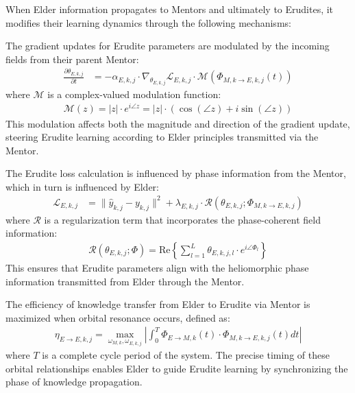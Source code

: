 When Elder information propagates to Mentors and ultimately to Erudites, it modifies their learning dynamics through the following mechanisms:

\begin{theorem}
The gradient updates for Erudite parameters are modulated by the incoming fields from their parent Mentor:
\begin{align}
\frac{\partial \theta_{E,k,j}}{\partial t} &= -\alpha_{E,k,j} \cdot \nabla_{\theta_{E,k,j}} \mathcal{L}_{E,k,j} \cdot \mathcal{M}(\Phi_{M,k \rightarrow E,k,j}(t))
\end{align}
where $\mathcal{M}$ is a complex-valued modulation function:
\begin{align}
\mathcal{M}(z) = |z| \cdot e^{i\angle z} = |z| \cdot (\cos(\angle z) + i\sin(\angle z))
\end{align}
This modulation affects both the magnitude and direction of the gradient update, steering Erudite learning according to Elder principles transmitted via the Mentor.
\end{theorem}

\begin{theorem}
The Erudite loss calculation is influenced by phase information from the Mentor, which in turn is influenced by Elder:
\begin{align}
\mathcal{L}_{E,k,j} &= \|\hat{y}_{k,j} - y_{k,j}\|^2 + \lambda_{E,k,j} \cdot \mathcal{R}(\theta_{E,k,j}; \Phi_{M,k \rightarrow E,k,j})
\end{align}
where $\mathcal{R}$ is a regularization term that incorporates the phase-coherent field information:
\begin{align}
\mathcal{R}(\theta_{E,k,j}; \Phi) = \text{Re}\left\{\sum_{l=1}^L \theta_{E,k,j,l} \cdot e^{i\angle \Phi_l}\right\}
\end{align}
This ensures that Erudite parameters align with the heliomorphic phase information transmitted from Elder through the Mentor.
\end{theorem}

\begin{theorem}
The efficiency of knowledge transfer from Elder to Erudite via Mentor is maximized when orbital resonance occurs, defined as:
\begin{align}
\eta_{E \rightarrow E,k,j} = \max_{\omega_{M,k}, \omega_{E,k,j}} \left| \int_0^T \Phi_{E \rightarrow M,k}(t) \cdot \Phi_{M,k \rightarrow E,k,j}(t) dt \right|
\end{align}
where $T$ is a complete cycle period of the system. The precise timing of these orbital relationships enables Elder to guide Erudite learning by synchronizing the phase of knowledge propagation.
\end{theorem}

